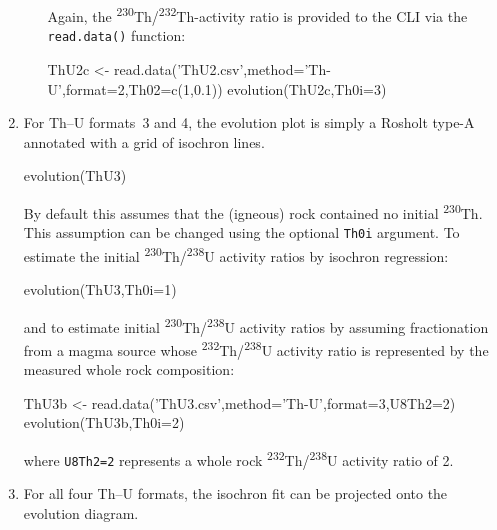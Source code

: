 \begin{refsection}
\begin{enumerate}
\begin{enumerate}
    Again, the
    \textsuperscript{230}Th/\textsuperscript{232}Th-activity ratio is
    provided to the CLI via the \texttt{read.data()} function:
    
\begin{script}
ThU2c <- read.data('ThU2.csv',method='Th-U',format=2,Th02=c(1,0.1))
evolution(ThU2c,Th0i=3)
\end{script}

\end{enumerate}

\item For Th--U formats~3 and 4, the evolution plot is simply a
  Rosholt type-A annotated with a grid of isochron lines.

\begin{console}
evolution(ThU3)
\end{console}

By default this assumes that the (igneous) rock contained no initial
\textsuperscript{230}Th. This assumption can be changed using the
optional \texttt{Th0i} argument. To estimate the initial
\textsuperscript{230}Th/\textsuperscript{238}U activity ratios by
isochron regression:

\begin{console}
evolution(ThU3,Th0i=1)
\end{console}

\noindent and to estimate initial
\textsuperscript{230}Th/\textsuperscript{238}U activity ratios by
assuming fractionation from a magma source whose
\textsuperscript{232}Th/\textsuperscript{238}U activity ratio is
represented by the measured whole rock composition:

\begin{console}
ThU3b <- read.data('ThU3.csv',method='Th-U',format=3,U8Th2=2)
evolution(ThU3b,Th0i=2)
\end{console}

\noindent where \texttt{U8Th2=2} represents a whole rock
\textsuperscript{232}Th/\textsuperscript{238}U activity ratio of 2.

\item For all four Th--U formats, the isochron fit can be projected
  onto the evolution diagram.\\


\end{enumerate}
\end{refsection}
